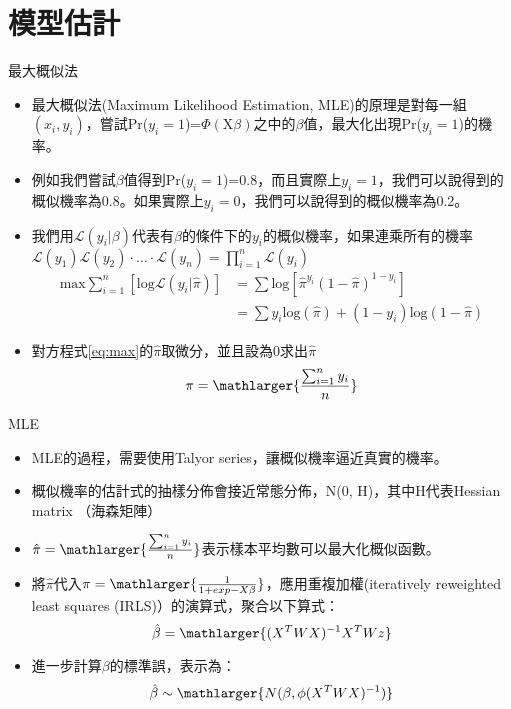 \documentclass[border=10pt]{beamer}
\begin{document}
\section{模型估計}
\begin{frame}{最大概似法}
\begin{itemize}
\item 最大概似法(Maximum Likelihood Estimation, MLE)的原理是對每一組$(x_{i}, y_{i})$，嘗試Pr($y_{i}=1$)=$\Phi(\text{X}\beta)$之中的$\beta$值，最大化出現Pr($y_{i}=1$)的機率。
\item 例如我們嘗試$\beta$值得到Pr($y_{i}=1$)=0.8，而且實際上$y_{i}=1$，我們可以說得到的概似機率為0.8。如果實際上$y_{i}=0$，我們可以說得到的概似機率為0.2。
\item 我們用$\mathcal{L}(y_{i}|\beta)$代表有$\beta$的條件下的$y_{i}$的概似機率，如果連乘所有的機率$\mathcal{L}(y_{1})\mathcal{L}(y_{2})\cdot\ldots\cdot\mathcal{L}(y_{n})=\prod_{i=1}^n\mathcal{L}(y_{i})$
\begin{align}
\text{max}\sum_{i=1}^{n}[\text{log}\mathcal{L}(y_{i}|\hat{\pi})]&=\sum \text{log}[\hat{\pi}^{y_{i}}(1-\hat{\pi})^{1-y_{i}}] \nonumber \\
  & =  \sum y_{i}\text{log}(\hat{\pi})+(1-y_{i})\text{log}(1-\hat{\pi})
\label{eq:max}
\end{align}
\item 對方程式\hspace{.5em}\textcolor{white}{\ref{eq:max}}\hspace{.5em}的$\hat{\pi}$取微分，並且設為0求出$\hat{\pi}$
\[\pi=\mathlarger{\frac{\sum_{i=1}^n y_{i}}{n}} \]
\end{itemize}
\end{frame}
\begin{frame}{MLE}
\begin{itemize} 
\item MLE的過程，需要使用Talyor series，讓概似機率逼近真實的機率。
\item 概似機率的估計式的抽樣分佈會接近常態分佈，N(0, H)，其中H代表Hessian matrix （海森矩陣）
\item $\hat{\pi}=\mathlarger{\frac{\sum_{i=1}^n y_{i}}{n}}$表示樣本平均數可以最大化概似函數。
\item 將$\hat{\pi}$代入$\pi=\mathlarger{\frac{1}{1+exp{-X\beta}}}$，應用重複加權(iteratively reweighted least squares (IRLS)）的演算式，聚合以下算式：
\[\hat{\beta}=\mathlarger{(X^{T}WX)^{-1}X^{T}Wz} \]
\item 進一步計算$\beta$的標準誤，表示為：
\[\hat{\beta}\sim \mathlarger{N(\beta, \phi(X^{T}WX)^{-1})} \]
\end{itemize}
\end{frame}
\end{document}

